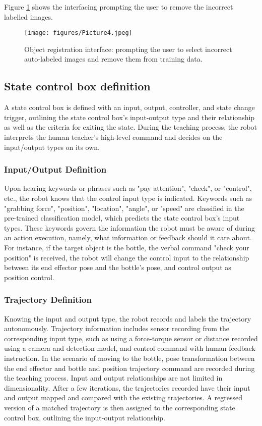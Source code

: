 \documentclass[conference]{IEEEtran}
\begin{document}
Figure \ref{fig:registration} shows the interfacing prompting the user to remove the incorrect labelled images.

\begin{figure}[!htb]
\centering
\texttt{[image: figures/Picture4.jpeg]}
\caption{\label{fig:registration}Object registration interface: prompting the user to select incorrect auto-labeled images and remove them from training data.}
\end{figure}

\subsection{State control box definition}

A state control box is defined with an input, output, controller, and state change trigger, outlining the state control box's input-output type and their relationship as well as the criteria for exiting the state. During the teaching process, the robot interprets the human teacher's high-level command and decides on the input/output types on its own. 

\subsubsection{Input/Output Definition}
Upon hearing keywords or phrases such as "pay attention", "check", or "control", etc., the robot knows that the control input type is indicated. Keywords such as "grabbing force", "position", "location", "angle", or "speed" are classified in the pre-trained classification model, which predicts the state control box's input types. These keywords govern the information the robot must be aware of during an action execution, namely, what information or feedback should it care about. For instance, if the target object is the bottle, the verbal command "check your position" is received, the robot will change the control input to the relationship between its end effector pose and the bottle's pose, and control output as position control.

\subsubsection{Trajectory Definition}
Knowing the input and output type, the robot records and labels the trajectory autonomously. Trajectory information includes sensor recording from the corresponding input type, such as using a force-torque sensor or distance recorded using a camera and detection model, and control command with human feedback instruction. In the scenario of moving to the bottle, pose transformation between the end effector and bottle and position trajectory command are recorded during the teaching process. Input and output relationships are not limited in dimensionality. After a few iterations, the trajectories recorded have their input and output mapped and compared with the existing trajectories. A regressed version of a matched trajectory is then assigned to the corresponding state control box, outlining the input-output relationship.
\end{document}
